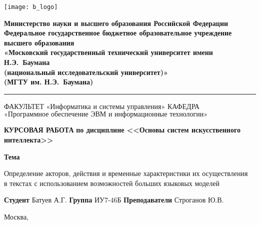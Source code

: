 \thispagestyle{empty}

\noindent \begin{minipage}{0.15\textwidth}
	\texttt{[image: b\_logo]}
\end{minipage}
\noindent\begin{minipage}{0.85\textwidth}\centering
	\textbf{Министерство науки и высшего образования Российской Федерации}\\
	\textbf{Федеральное государственное бюджетное образовательное учреждение высшего образования}\\
	\textbf{«Московский государственный технический университет имени Н.Э.~Баумана}\\
	\textbf{(национальный исследовательский университет)»}\\
	\textbf{(МГТУ им. Н.Э.~Баумана)}
\end{minipage}

\noindent\rule{\linewidth}{3pt}
\newline\newline
\noindent ФАКУЛЬТЕТ $\text{«Информатика и системы управления»}$ \newline\newline
\noindent КАФЕДРА $\text{«Программное обеспечение ЭВМ и информационные технологии»}$

\vspace{1cm}

\begin{center}
	\noindent\begin{minipage}{1\textwidth}
		\centering
		\Large\textbf{КУРСОВАЯ РАБОТА}\newline
		\textbf{по дисциплине <<Основы систем искусственного интеллекта>>}\newline\newline
	\end{minipage}
\end{center}

\noindent\textbf{Тема} \parbox[t]{\linewidth}{
    Определение акторов, действия и временные характеристики их осуществления \\
	в текстах с использованием возможностей больших языковых моделей
}\newline\newline
\noindent\textbf{Студент} $\text{Батуев А.Г.}$\newline\newline
\noindent\textbf{Группа} $\text{ИУ7-46Б}$\newline\newline
\noindent\textbf{Преподаватели} $\text{Строганов Ю.В.}$\newline

\begin{center}
	\vfill
	Москва,~\the\year
\end{center}
\clearpage
